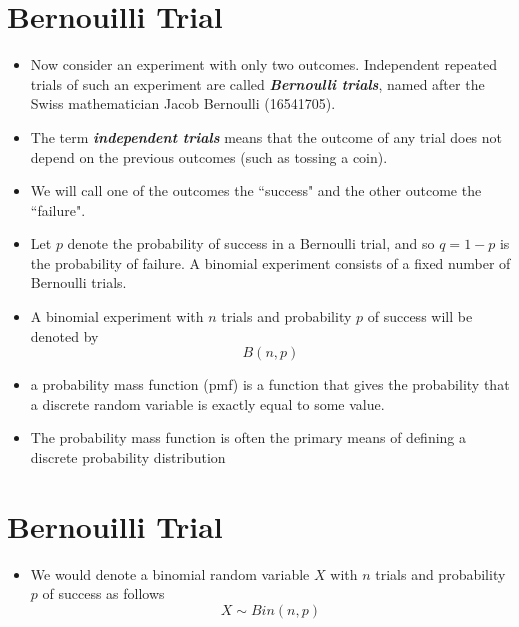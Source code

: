 \documentclass[]{report}
\begin{document}
\section{Bernouilli Trial}
\begin{itemize}
	\item Now consider an experiment with only two outcomes. Independent repeated trials of such an experiment are
	called \textbf{\textit{Bernoulli trials}}, named after the Swiss mathematician Jacob Bernoulli (16541705). \item The term \textbf{\emph{independent
			trials}} means that the outcome of any trial does not depend on the previous outcomes (such as tossing a coin).
	\item We will call one of the outcomes the ``success" and the other outcome the ``failure".
	
	\item
	Let $p$ denote the probability of success in a Bernoulli trial, and so $q = 1 - p$ is the probability of failure.
	A binomial experiment consists of a fixed number of Bernoulli trials. \item A binomial experiment with $n$ trials and
	probability $p$ of success will be denoted by
	\[B(n, p)\]
	\item a probability mass function (pmf) is a function that gives the probability that a 
	discrete random variable is exactly equal to some value. 
	\item The probability mass function is often the primary means of defining a discrete probability distribution 
\end{itemize}


\section*{Bernouilli Trial}
\begin{itemize}


\item We would denote a binomial random variable $X$ with $n$ trials and
probability $p$ of success as follows
\[X \sim Bin(n, p)\]

\end{itemize}



\end{document}

